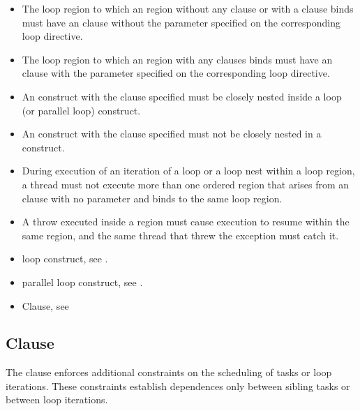 \begin{itemize}
\item The loop region to which an  region without any clause or with a  clause binds must have an  clause without the parameter specified on the corresponding loop directive. 

\item The loop region to which an  region with any  clauses binds must have an  clause with the parameter specified on the corresponding loop directive. 

\item An  construct with the  clause specified must be closely nested inside a loop (or parallel loop) construct. 

\item An  construct with the  clause specified must not be closely nested in a  construct. 

\item During execution of an iteration of a loop or a loop nest within a loop region, a thread must not execute more than one ordered region that arises from an  clause with no parameter and binds to the same loop region. 
\end{itemize}
\cppspecificstart
\begin{itemize}
\item A throw executed inside a  region must cause execution to resume within 
the same  region, and the same thread that threw the exception must catch 
it.
\end{itemize}
\cppspecificend



\crossreferences
\begin{itemize}
\item loop construct, see 
.

\item parallel loop construct, see 
.

\item {} Clause, see
\end{itemize}


\subsection{ Clause}
\label{subsec:depend Clause}
\summary
The  clause enforces additional constraints on the scheduling of tasks or loop iterations.  These 
constraints establish dependences only between sibling tasks or between loop iterations. 

